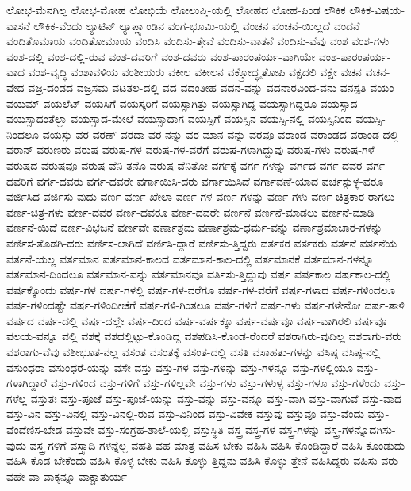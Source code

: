 {ಲೋಭ-ಮೆನಗಿಲ್ಲ
ಲೋಭ-ಮೋಹ
ಲೋಭಿಯೆ
ಲೋಲುಪ್ತಿ-ಯಲ್ಲಿ
ಲೋಹದ
ಲೋಹ-ಪಿಂಡ
ಲೌಕಿಕ
ಲೌಕಿಕ-ವಿಷಯ-ವಾಸನೆ
ಲೌಕಿಕ-ವೆಂದು
ಲ್ಯಾಟಿನ್
ಲ್ಯಾಪ್ಲ್ಯಾಂಡಿನ
ವಂಗ-ಭೂಮಿ-ಯಲ್ಲಿ
ವಂಚನ
ವಂಚನೆ-ಯಿಲ್ಲದೆ
ವಂದನೆ
ವಂದಿತೊಮಾಯ
ವಂದಿತೋಮಾಯ
ವಂದಿಸಿ
ವಂದಿಸು-ತ್ತೇವೆ
ವಂದಿಸು-ವಾತನೆ
ವಂದಿಸು-ವೆವು
ವಂಶ
ವಂಶ-ಗಳು
ವಂಶ-ದಲ್ಲಿ
ವಂಶ-ದಲ್ಲಿ-ರುವ
ವಂಶ-ದವರಿಗೆ
ವಂಶ-ದವರು
ವಂಶ-ಪಾರಂಪರ್ಯ-ವಾಗಿಯೇ
ವಂಶ-ಪಾರಂಪರ್ಯ-ವಾದ
ವಂಶ-ವೃದ್ಧಿ
ವಂಶಾವಳಿಯ
ವಂಶೀಯರು
ವಕೀಲ
ವಕೀಲನ
ವಕ್ತ್ರೋದ್ಧೃತೋಪಿ
ವಕ್ಷದಲಿ
ವಕ್ಷೇ
ವಚನ
ವಚನ-ವೇದ
ವಜ್ರ-ದಂಡದ
ವಜ್ರಸಮ
ವಟತಲ-ದಲ್ಲಿ
ವದ
ವದಂತೀಹ
ವದನ-ವನ್ನು
ವದನಾರವಿಂದ-ವನು
ವನಸ್ಪತಿ
ವಯಂ
ವಯಮ್
ವಯಲೆಟ್
ವಯಸಿಗೆ
ವಯಸ್ಕರಿಗೆ
ವಯಸ್ಸಾಗಿತ್ತು
ವಯಸ್ಸಾಗಿದ್ದ
ವಯಸ್ಸಾಗಿದ್ದರೂ
ವಯಸ್ಸಾದ
ವಯಸ್ಸಾದಂತೆಲ್ಲಾ
ವಯಸ್ಸಾದ-ಮೇಲೆ
ವಯಸ್ಸಾದಾಗ
ವಯಸ್ಸಿಗೆ
ವಯಸ್ಸಿನ
ವಯಸ್ಸಿ-ನಲ್ಲಿ
ವಯಸ್ಸಿನಿಂದ
ವಯಸ್ಸಿ-ನಿಂದಲೂ
ವಯಸ್ಸು
ವರ
ವರಣ್
ವರದಾ
ವರ-ನನ್ನು
ವರ-ಮಾನ-ವನ್ನು
ವರವೂ
ವರಾಂಡ
ವರಾಂಡದ
ವರಾಂಡ-ದಲ್ಲಿ
ವರಾನ್
ವರುಣರು
ವರುಷ
ವರುಷ-ಗಳ
ವರುಷ-ಗಳ-ವರೆಗೆ
ವರುಷ-ಗಳಾಗಿದ್ದುವು
ವರುಷ-ಗಳು
ವರುಷ-ಗಳೆ
ವರುಷದ
ವರುಷವೂ
ವರುಷ-ವೆನಿ-ತನೊ
ವರುಷ-ವೆನಿತೋ
ವರ್ಗಕ್ಕೆ
ವರ್ಗ-ಗಳನ್ನು
ವರ್ಗದ
ವರ್ಗ-ದವರ
ವರ್ಗ-ದವರಿಗೆ
ವರ್ಗ-ದವರು
ವರ್ಗ-ದವರೇ
ವರ್ಗಾಯಿಸಿ-ದರು
ವರ್ಗಾಯಿಸಿದೆ
ವರ್ಗಾವಣೆ-ಯಾದ
ವರ್ಚಸ್ಸುಳ್ಳ-ವರೂ
ವರ್ಜಿಸಿದ
ವರ್ಜಿಸು-ವುದು
ವರ್ಣ
ವರ್ಣ-ಖೇಲಾ
ವರ್ಣ-ಗಳ
ವರ್ಣ-ಗಳನ್ನು
ವರ್ಣ-ಗಳು
ವರ್ಣ-ಚಿತ್ರಕಾರ-ರಾಗಲು
ವರ್ಣ-ಚಿತ್ರ-ಗಳು
ವರ್ಣ-ದವರ
ವರ್ಣ-ದವರೂ
ವರ್ಣ-ದವರೇ
ವರ್ಣನೆ
ವರ್ಣನೆ-ಮಾಡಲು
ವರ್ಣನೆ-ಮಾಡಿ
ವರ್ಣನೆ-ಯಿದೆ
ವರ್ಣ-ವಿಭಜನೆ
ವರ್ಣವೇ
ವರ್ಣಾಶ್ರಮ
ವರ್ಣಾಶ್ರಮ-ಧರ್ಮ-ವನ್ನು
ವರ್ಣಾಶ್ರಮಾಚಾರ-ಗಳನ್ನು
ವರ್ಣಿಸ-ತೊಡಗಿ-ದರು
ವರ್ಣಿಸ-ಲಾಗಿದೆ
ವರ್ಣಿಸಿ-ದ್ದಾರೆ
ವರ್ಣಿಸು-ತ್ತಿದ್ದರು
ವರ್ತಕರ
ವರ್ತಕರು
ವರ್ತನೆ
ವರ್ತನೆಯ
ವರ್ತನೆ-ಯಲ್ಲ
ವರ್ತಮಾನ
ವರ್ತಮಾನ-ಕಾಲದ
ವರ್ತಮಾನ-ಕಾಲ-ದಲ್ಲಿ
ವರ್ತಮಾನಕೆ
ವರ್ತಮಾನ-ಗಳನ್ನೂ
ವರ್ತಮಾನ-ದಿಂದಲೂ
ವರ್ತಮಾನ-ವನ್ನು
ವರ್ತಮಾನವೂ
ವರ್ತಿಸು-ತ್ತಿದ್ದುವು
ವರ್ಷ
ವರ್ಷಕಾಲ
ವರ್ಷಕಾಲ-ದಲ್ಲಿ
ವರ್ಷಕ್ಕೊಂದು
ವರ್ಷ-ಗಳ
ವರ್ಷ-ಗಳಲ್ಲಿ
ವರ್ಷ-ಗಳ-ವರೆಗೂ
ವರ್ಷ-ಗಳ-ವರೆಗೆ
ವರ್ಷ-ಗಳಾದ
ವರ್ಷ-ಗಳಿಂದಲೂ
ವರ್ಷ-ಗಳಿಂದಷ್ಟೇ
ವರ್ಷ-ಗಳಿಂದೀಚೆಗೆ
ವರ್ಷ-ಗಳಿ-ಗಿಂತಲೂ
ವರ್ಷ-ಗಳಿಗೆ
ವರ್ಷ-ಗಳು
ವರ್ಷ-ಗಳೇನೋ
ವರ್ಷ-ತಾಳಿ
ವರ್ಷದ
ವರ್ಷ-ದಲ್ಲಿ
ವರ್ಷ-ದಲ್ಲೇ
ವರ್ಷ-ದಿಂದ
ವರ್ಷ-ವರ್ಷಕ್ಕೂ
ವರ್ಷ-ವರ್ಷವೂ
ವರ್ಷ-ವಾಗಿರಲಿ
ವರ್ಷವೂ
ವಲಯ-ವನ್ನೂ
ವಲ್ಲಿ
ವಶಕ್ಕೆ
ವಶದಲ್ಲಿಟ್ಟು-ಕೊಂಡಿದ್ದ
ವಶಪಡಿಸಿ-ಕೊಂಡ-ರೆಂದರೆ
ವಶರಾಗಿರು-ವುದಿಲ್ಲ
ವಶರಾಗು-ವರು
ವಶರಾಗು-ವೆವು
ವಶೀಭೂತ-ನಲ್ಲ
ವಸಂತ
ವಸಂತಕ್ಕೆ
ವಸಂತ-ದಲ್ಲಿ
ವಸತಿ
ವಸಾಹತು-ಗಳನ್ನು
ವಸಿಷ್ಠ
ವಸಿಷ್ಠ-ನಲ್ಲಿ
ವಸುಂಧರಾ
ವಸುಂಧರೆ-ಯನ್ನು
ವಸೇ
ವಸ್ತು
ವಸ್ತು-ಗಳ
ವಸ್ತು-ಗಳನ್ನು
ವಸ್ತು-ಗಳನ್ನೂ
ವಸ್ತು-ಗಳಲ್ಲಿಯೂ
ವಸ್ತು-ಗಳಾಗಿದ್ದಾರೆ
ವಸ್ತು-ಗಳಿಂದ
ವಸ್ತು-ಗಳಿಗೆ
ವಸ್ತು-ಗಳಿಲ್ಲವೇ
ವಸ್ತು-ಗಳು
ವಸ್ತು-ಗಳುಳ್ಳ
ವಸ್ತು-ಗಳೂ
ವಸ್ತು-ಗಳೆಂದು
ವಸ್ತು-ಗಳೆಲ್ಲ
ವಸ್ತುತಃ
ವಸ್ತು-ಪೂಜೆ
ವಸ್ತು-ಪೂಜೆ-ಯನ್ನು
ವಸ್ತು-ವನ್ನು
ವಸ್ತು-ವನ್ನೂ
ವಸ್ತು-ವಾಗಿ
ವಸ್ತು-ವಾಗುವೆ
ವಸ್ತು-ವಾದ
ವಸ್ತು-ವಿನ
ವಸ್ತು-ವಿನಲ್ಲಿ
ವಸ್ತು-ವಿನಲ್ಲಿ-ರುವ
ವಸ್ತು-ವಿನಿಂದ
ವಸ್ತು-ವಿವೇಕ
ವಸ್ತುವು
ವಸ್ತುವೂ
ವಸ್ತು-ವೆಂದು
ವಸ್ತು-ವೆಂದೆಣಿಸ-ಬೇಡ
ವಸ್ತುವೇ
ವಸ್ತು-ಸಂಗ್ರಹ-ಶಾಲೆ-ಯಲ್ಲಿ
ವಸ್ತುಸ್ಥಿತಿ
ವಸ್ತ್ರ
ವಸ್ತ್ರ-ಗಳ
ವಸ್ತ್ರ-ಗಳನ್ನು
ವಸ್ತ್ರ-ಗಳನ್ನೊದಗಿಸು-ವುದು
ವಸ್ತ್ರ-ಗಳಿಗೆ
ವಸ್ತ್ರಾದಿ-ಗಳನ್ನೆಲ್ಲ
ವಹತಿ
ವಹ-ಮಾತ್ರ
ವಹಿಸ-ಬೇಕು
ವಹಿಸಿ
ವಹಿಸಿ-ಕೊಂಡಿದ್ದಾರೆ
ವಹಿಸಿ-ಕೊಂಡುದು
ವಹಿಸಿ-ಕೊಡ-ಬೇಕೆಂದು
ವಹಿಸಿ-ಕೊಳ್ಳ-ಬೇಕು
ವಹಿಸಿ-ಕೊಳ್ಳು-ತ್ತಿದ್ದನು
ವಹಿಸಿ-ಕೊಳ್ಳು-ತ್ತೇನೆ
ವಹಿಸಿದ್ದರು
ವಹಿಸು-ವರು
ವಹೇ
ವಾ
ವಾಕ್ಕನ್ನೂ
ವಾಕ್ಚಾತುರ್ಯ
}
